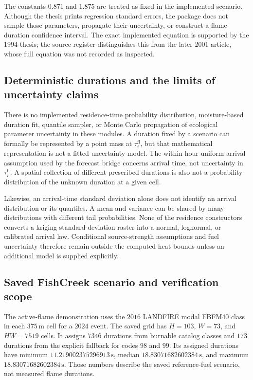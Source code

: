 \documentclass[11pt,a4paper]{article}
\begin{document}
The constants $0.871$ and $1.875$ are treated as fixed in the implemented
scenario. Although the thesis prints regression standard errors, the package
does not sample those parameters, propagate their uncertainty, or construct a
flame-duration confidence interval. The exact implemented equation is supported
by the 1994 thesis; the source register distinguishes this from the later
2001 article, whose full equation was not recorded as inspected.

\subsection{Deterministic durations and the limits of uncertainty claims}

There is no implemented residence-time probability distribution, moisture-based
duration fit, quantile sampler, or Monte Carlo propagation of ecological
parameter uncertainty in these modules. A duration fixed by a scenario can
formally be represented by a point mass at $\tau_i^{\mathrm{fl}}$, but that mathematical
representation is not a fitted uncertainty model. The within-hour uniform
arrival assumption used by the forecast bridge concerns arrival time, not
uncertainty in $\tau_i^{\mathrm{fl}}$. A spatial collection of different prescribed durations
is also not a probability distribution of the unknown duration at a given cell.

Likewise, an arrival-time standard deviation alone does not identify an arrival
distribution or its quantiles. A mean and variance can be shared by many
distributions with different tail probabilities. None of the residence
constructors converts a kriging standard-deviation raster into a normal,
lognormal, or calibrated arrival law. Conditional source-strength assumptions
and fuel uncertainty therefore remain outside the computed heat bounds unless
an additional model is supplied explicitly.

\subsection{Saved FishCreek scenario and verification scope}

The active-flame demonstration uses the $2016$ LANDFIRE modal FBFM40 class in
each $375\,\mathrm{m}$ cell for a $2024$ event. The saved grid has
$H=103$, $W=73$, and $HW=7519$ cells. It assigns $7346$ durations from burnable
catalog classes and $173$ durations from the explicit fallback for codes $98$
and $99$. Its assigned durations have minimum
$11.219002375296913\,\mathrm{s}$, median
$18.83071682602384\,\mathrm{s}$, and maximum
$18.83071682602384\,\mathrm{s}$. Those numbers describe the saved reference-fuel
scenario, not measured flame durations.
\end{document}
